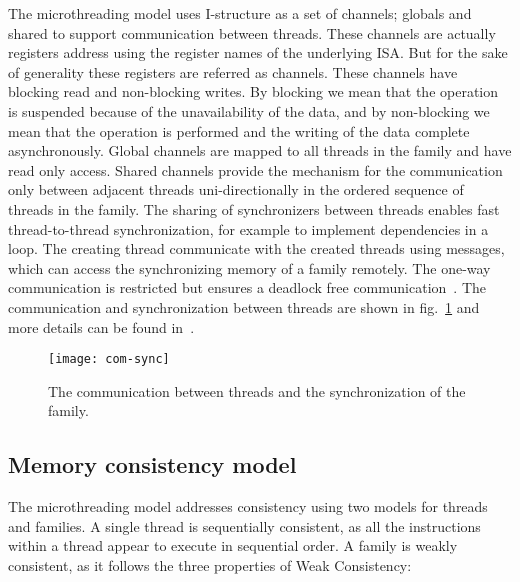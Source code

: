 \documentclass{article}
\begin{document}
The microthreading model uses I-structure as a set of channels; globals and
shared to support communication between threads. These channels are actually
registers address using the register names of the underlying ISA. But for the
sake of generality these registers are referred as channels. These channels
have blocking read and non-blocking writes. By blocking we mean that the
operation is suspended because of the unavailability of the data, and by
non-blocking we mean that the operation is performed and the writing of the
data complete asynchronously. Global channels are mapped to all threads in the
family and have read only access. Shared channels provide the mechanism for the
communication only between adjacent threads uni-directionally in the ordered
sequence of threads in the family. The sharing of synchronizers between threads
enables fast thread-to-thread synchronization, for example to implement
dependencies in a loop. The creating thread communicate with the created
threads using messages, which can access the synchronizing memory of a family
remotely. The one-way communication is restricted but ensures a deadlock free
communication~\cite{Vu:2007:FSV:1775348.1775375}. The communication and
synchronization between threads are shown in fig.~\ref{fig:com-sync} and more
details can be found in~\cite[Sec.~4.3.3.3]{poss.12}. 

\begin{figure}

\begin{centering}

\texttt{[image: com-sync]}

\caption{\label{fig:com-sync}The communication between threads and the
synchronization of the family.}

\end{centering}

\end{figure}

\subsection{Memory consistency model}

The microthreading model addresses consistency using two models for threads and
families. A single thread is sequentially consistent, as all the instructions
within a thread appear to execute in sequential order. A family is weakly
consistent, as it follows the three properties of Weak Consistency:
\end{document}
